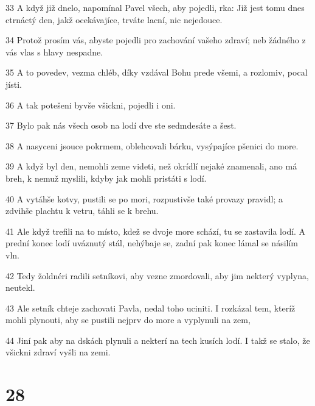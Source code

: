 \par 33 A když již dnelo, napomínal Pavel všech, aby pojedli, rka: Již jest tomu dnes ctrnáctý den, jakž ocekávajíce, trváte lacní, nic nejedouce.
\par 34 Protož prosím vás, abyste pojedli pro zachování vašeho zdraví; neb žádného z vás vlas s hlavy nespadne.
\par 35 A to povedev, vezma chléb, díky vzdával Bohu prede všemi, a rozlomiv, pocal jísti.
\par 36 A tak potešeni byvše všickni, pojedli i oni.
\par 37 Bylo pak nás všech osob na lodí dve ste sedmdesáte a šest.
\par 38 A nasyceni jsouce pokrmem, oblehcovali bárku, vysýpajíce pšenici do more.
\par 39 A když byl den, nemohli zeme videti, než okrídlí nejaké znamenali, ano má breh, k nemuž myslili, kdyby jak mohli pristáti s lodí.
\par 40 A vytáhše kotvy, pustili se po mori, rozpustivše také provazy pravidl; a zdvihše plachtu k vetru, táhli se k brehu.
\par 41 Ale když trefili na to místo, kdež se dvoje more schází, tu se zastavila lodí. A prední konec lodí uváznutý stál, nehýbaje se, zadní pak konec lámal se násilím vln.
\par 42 Tedy žoldnéri radili setníkovi, aby vezne zmordovali, aby jim nekterý vyplyna, neutekl.
\par 43 Ale setník chteje zachovati Pavla, nedal toho uciniti. I rozkázal tem, kteríž mohli plynouti, aby se pustili nejprv do more a vyplynuli na zem,
\par 44 Jiní pak aby na dskách plynuli a nekterí na tech kusích lodí. I takž se stalo, že všickni zdraví vyšli na zemi.

\chapter{28}

